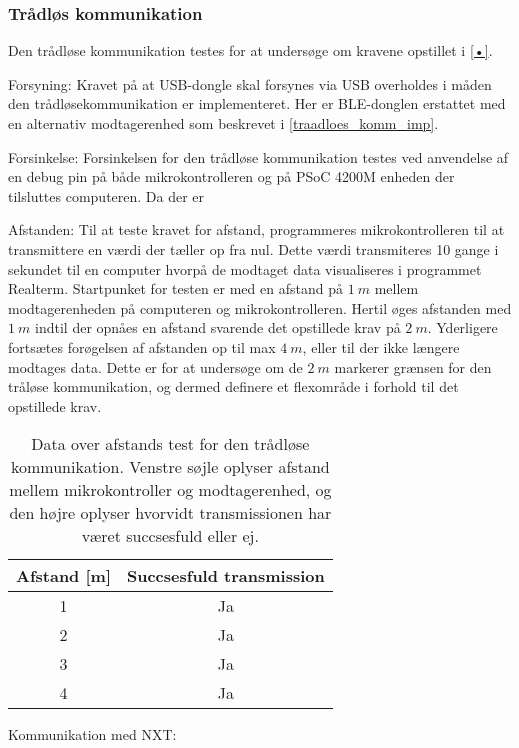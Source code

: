 \subsubsection{Trådløs kommunikation}
Den trådløse kommunikation testes for at undersøge om kravene opstillet i \autoref{•}. 


Forsyning:
Kravet på at USB-dongle skal forsynes via USB overholdes i måden den trådløsekommunikation er implementeret. Her er BLE-donglen erstattet med en alternativ modtagerenhed som beskrevet i \autoref{traadloes_komm_imp}.


Forsinkelse:
Forsinkelsen for den trådløse kommunikation testes ved anvendelse af en debug pin på både mikrokontrolleren og på PSoC 4200M enheden der tilsluttes computeren. Da der er



Afstanden:
Til at teste kravet for afstand, programmeres mikrokontrolleren til at transmittere en værdi der tæller op fra nul. Dette værdi transmiteres 10 gange i sekundet til en computer hvorpå de modtaget data visualiseres i programmet Realterm.
Startpunket for testen er med en afstand på $1~m$ mellem modtagerenheden på computeren og mikrokontrolleren. 
Hertil øges afstanden med $1~m$ indtil der opnåes en afstand svarende det opstillede krav på $2~m$. Yderligere fortsætes forøgelsen af afstanden op til max $4~m$, eller til der ikke længere modtages data. Dette er for at undersøge om de $2~m$ markerer grænsen for den tråløse kommunikation, og dermed definere et flexområde i forhold til det opstillede krav.  

\begin{table}[H]
\begin{tabular}{|c|c|}
\hline 
Afstand [m] & Succsesfuld transmission \\ 
\hline 
1 & Ja \\ 
\hline 
2 & Ja \\ 
\hline 
3 & Ja \\ 
\hline 
4 & Ja \\ 
\hline 
\end{tabular} 
\caption{Data over afstands test for den trådløse kommunikation. Venstre søjle oplyser afstand mellem mikrokontroller og modtagerenhed, og den højre oplyser hvorvidt transmissionen har været succsesfuld eller ej.}
\label{tab:traadloes_komm_test_afstand}
\end{table}


Kommunikation med NXT:
